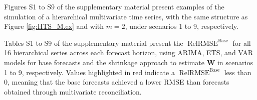 \documentclass[a4paper,preprint,11pt,authoryear]{elsarticle}
\DeclareMathOperator{\RelRMSE}{RelRMSE}
\DeclareMathOperator{\Base}{Base}
\begin{document}
Figures S1 to S9 of the supplementary material present examples of the simulation of a hierarchical multivariate time series, with the same structure as Figure \ref{fig:HTS_M.ex} and with $m=2$, under scenarios 1 to 9, respectively.

Tables S1 to S9 of the supplementary material present the $\RelRMSE^{\Base}$ for all 16 hierarchical series across each forecast horizon, using ARIMA, ETS, and VAR models for base forecasts and the shrinkage approach to estimate $\bm{W}$ in scenarios 1 to 9, respectively. Values highlighted in red indicate a $\RelRMSE^{\Base}$ less than 0, meaning that the base forecasts achieved a lower RMSE than forecasts obtained through multivariate reconciliation.

\begin{table}
  \caption{Average of $\RelRMSE^{\Base}$ of the 16 series for different forecast horizons and for each scenario. ARIMA, ETS, and VAR models for base forecasts. Using the shrinkage approach to estimate $\bm{W}$. All values are positive, indicating reconciliation always improves upon base forecasts, on average.}
  \centering
\end{table}
\end{document}

